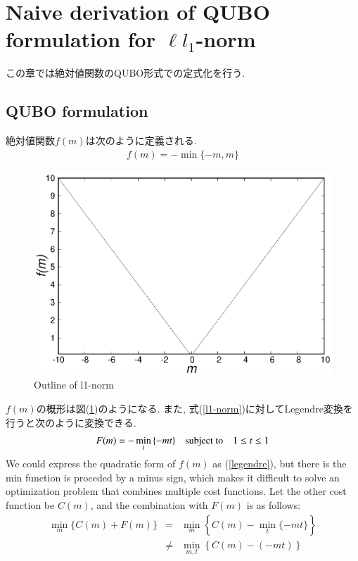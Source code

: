 \documentclass[fp,twocolumn]{jpsj3}
\begin{document}
\section{Naive derivation of QUBO formulation for $\ell{l}_{1}$-norm} \label{Native_derivation}
この章では絶対値関数のQUBO形式での定式化を行う.
\subsection{QUBO formulation}
絶対値関数$f(m)$は次のように定義される.
\begin{eqnarray}
  f(m)=-\min{\{-m,m\}} \label{l1-norm}
\end{eqnarray}
\begin{figure}[htbp]
  \begin{center}
    \includegraphics[keepaspectratio,scale=0.50]{absolute.eps}
    \caption{Outline of l1-norm}
    \label{fig:absolute}
  \end{center}
\end{figure}
$f(m)$の概形は図(\ref{fig:absolute})のようになる. また, 式(\ref{l1-norm})に対してLegendre変換を行うと次のように変換できる. 
\begin{eqnarray}
  F(m)=-\min_{t}{\{-mt\}} \quad \text{subject to} \quad \-1 \leq t \leq 1 \label{legendre}
\end{eqnarray}
We could express the quadratic form of $f(m)$ as (\ref{legendre}), but there is the min function is proceded by a minus sign, which makes it difficult to solve an optimization problem that combines multiple cost functions. Let the other cost function be $C(m)$, and the combination with $F(m)$ is as follows:
\begin{eqnarray}
  \min_{m}{\{C(m)+F(m)\}} &=& \min_{m}\left\{C(m)-\min_{t}{\{-mt\}}\right\} \nonumber \\
  &\neq & \min_{m,t}{\left\{C(m)-(-mt)\right\}} \nonumber 
\end{eqnarray}
\end{document}
